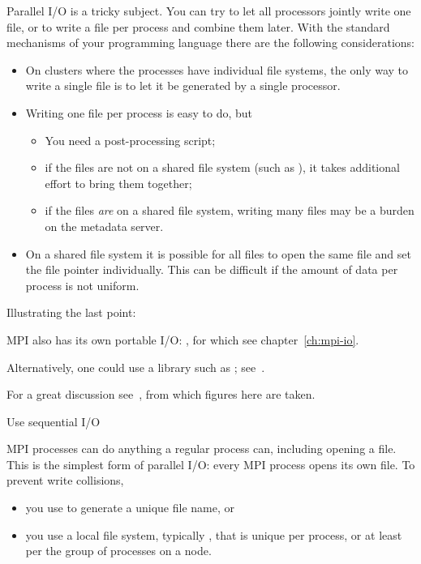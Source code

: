 
Parallel I/O is a tricky subject. You can try to let all processors
jointly write one file, or to write a file per process and combine
them later. With the standard mechanisms of your programming language
there are the following considerations:
\begin{itemize}
\item On clusters where the processes have individual file systems,
  the only way to write a single file is to let it be generated by a
  single processor.
\item Writing one file per process is easy to do, but
  \begin{itemize}
  \item You need a post-processing script;
  \item if the files are not on a shared file system (such as
    ), it takes additional effort to bring them
    together;
  \item if the files \emph{are} on a shared file system, writing many
    files may be a burden on the metadata server.
  \end{itemize}
\item On a shared file system it is possible for all files to open the
  same file and set the file pointer individually. This can be
  difficult if the amount of data per process is not uniform.
\end{itemize}
Illustrating the last point:
%

MPI also has its own portable I/O: , for which
see chapter~\ref{ch:mpi-io}.

Alternatively, one could use a library such as ;
see~.

For a great discussion see~\cite{Mendez:ParallelIOpage},
from which figures here are taken.

 {Use sequential I/O}

MPI processes can do anything a regular process can,
including opening a file.
This is the simplest form of parallel I/O:
every MPI process opens its own file.
To prevent write collisions,
\begin{itemize}
\item you use  to generate a unique file name, or
\item you use a local file system, typically , that is unique
  per process, or at least per the group of processes on a node.
\end{itemize}

